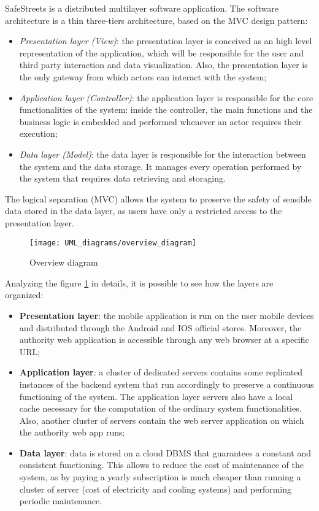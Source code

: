 SafeStreets is a distributed multilayer software application. The software architecture is a thin three-tiers architecture, based on the MVC design pattern:
\begin{itemize}
    \item \textit{Presentation layer (View)}: the presentation layer is conceived as an high level representation of the application, which will be responsible for the user and third party interaction and data visualization. Also, the presentation layer is the only gateway from which actors can interact with the system;
    \item \textit{Application layer (Controller)}: the application layer is responsible for the core functionalities of the system: inside the controller, the main functions and the business logic is embedded and performed whenever an actor requires their execution;
    \item \textit{Data layer (Model)}: the data layer is responsible for the interaction between the system and the data storage. It manages every operation performed by the system that requires data retrieving and storaging.
\end{itemize}
The logical separation (MVC) allows the system to preserve the safety of sensible data stored in the data layer, as users have only a restricted access to the presentation layer.
\begin{figure}[H]
    \centering
    \texttt{[image: UML\_diagrams/overview\_diagram]}
    \caption{Overview diagram}
    \label{fig:overview_diagram}
\end{figure}
Analyzing the figure \ref{fig:overview_diagram} in details, it is possible to see how the layers are organized:
\begin{itemize}
    \item \textbf{Presentation layer}: the mobile application is run on the user mobile devices and distributed through the Android and IOS official stores. Moreover, the authority web application is accessible through any web browser at a specific URL;
    \item \textbf{Application layer}: a cluster of dedicated servers contains some replicated instances of the backend system that run accordingly to preserve a continuous functioning of the system. The application layer servers also have a local cache necessary for the computation of the ordinary system functionalities. Also, another cluster of servers contain the web server application on which the authority web app runs; 
    \item \textbf{Data layer}: data is stored on a cloud DBMS that guarantees a constant and consistent functioning. This allows to reduce the cost of maintenance of the system, as by paying a yearly subscription is much cheaper than running a cluster of server (cost of electricity and cooling systems) and performing periodic maintenance.
\end{itemize} 
